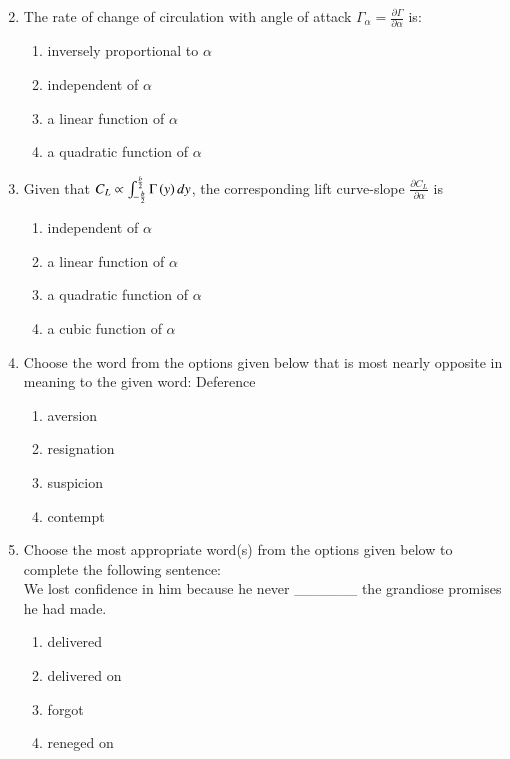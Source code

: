 \documentclass[journal,9pt,onecolumn]{IEEEtran}
\begin{document}
\begin{enumerate}
\setcounter{enumi}{1}
\item The rate of change of circulation with angle of attack $\Gamma_\alpha=\frac{\partial \Gamma}{\partial \alpha}$ is:
   \begin{multicols}{2}
   \begin{enumerate}
       \item inversely proportional to $\alpha$
       \item independent of $\alpha$
       \item a linear function of $\alpha$
       \item a quadratic function of $\alpha$
   \end{enumerate}
   \end{multicols}

\item Given that $C_L \propto \int_{-\frac{b}{2}}^{\frac{b}{2}} \Gamma\left(y\right) d y$, the corresponding lift curve-slope $\frac{\partial C_L}{\partial \alpha}$ is
   \begin{multicols}{2}
   \begin{enumerate}
       \item independent of $\alpha$
       \item a linear function of $\alpha$
       \item a quadratic function of $\alpha$
       \item a cubic function of $\alpha$
   \end{enumerate}
   \end{multicols}

\item Choose the word from the options given below that is most nearly opposite in meaning to the given word: Deference
   \begin{multicols}{4}
   \begin{enumerate}
       \item aversion
       \item resignation
       \item suspicion
       \item contempt
   \end{enumerate}
   \end{multicols}

\item Choose the most appropriate word(s) from the options given below to complete the following sentence: \\We lost confidence in him because he never \_\_\_\_\_\_ the grandiose promises he had made.
   \begin{multicols}{4}
   \begin{enumerate}
       \item delivered
       \item delivered on
       \item forgot
       \item reneged on
   \end{enumerate}
   \end{multicols}



\end{enumerate}
\end{document}
